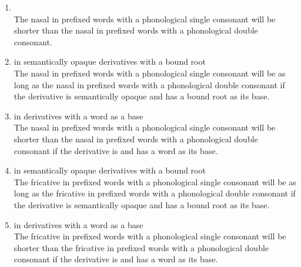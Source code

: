 	
\begin{enumerate}

	\item {}  \\
	The nasal in prefixed words with a phonological single consonant will be shorter than the nasal in prefixed words with a phonological double consonant. 
	
	\item{}  in semantically opaque derivatives with a bound root\\
	The nasal in prefixed words with a phonological single consonant will be as long as the nasal in prefixed words with a phonological double consonant if  the derivative is semantically opaque and has a bound root as its base.
	

	
	\item {}  in  derivatives with a word as a base \\
	The nasal in prefixed words with a phonological single consonant will be shorter than the nasal in prefixed words with a phonological double consonant if  the derivative is  and has a word as its base.
	
	
	\item {}  in semantically opaque derivatives with a bound root\\
	The fricative in prefixed words with a phonological single consonant will be as long as the fricative in prefixed words with a phonological double consonant if  the derivative is semantically opaque and has a bound root as its base.
	
	\item {}  in  derivatives with a word as a base \\
	The fricative in prefixed words with a phonological single consonant will be shorter than the fricative in prefixed words with a phonological double consonant if  the derivative is  and has a word as its base.\\
	

\end{enumerate}
